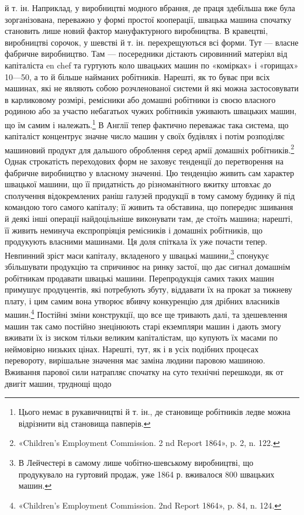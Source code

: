 й т. ін. Наприклад, у виробництві модного вбрання, де праця
здебільша вже була зорганізована, переважно у формі простої
кооперації, швацька машина спочатку становить лише новий
фактор мануфактурного виробництва. В кравецтві, виробництві
сорочок, у шевстві й т. ін. перехрещуються всі форми. Тут —
власне фабричне виробництво. Там — посередники дістають сировинний
матеріял від капіталіста en chef та гуртують коло швацьких
машин по «комірках» і «горищах» 10—50, а то й більше найманих
робітників. Нарешті, як то буває при всіх машинах, які не
являють собою розчленованої системи й які можна застосовувати
в карликовому розмірі, ремісники або домашні робітники із
своєю власного родиною або за участю небагатьох чужих робітників
уживають швацьких машин, що їм самим і належать.\footnote{
Цього немає в рукавичництві й т. ін., де становище робітників
ледве можна відрізнити від становища павперів.
}
В Англії тепер фактично переважає така система, що капіталіст
концентрує значне число машин у своїх будівлях і потім розподіляє
машиновий продукт для дальшого оброблення серед армії
домашніх робітників.\footnote{
«Children’s Employment Commission. 2 nd Report 1864», p. 2,
n. 122.
} Однак строкатість переходових форм
не заховує тенденції до перетворення на фабричне виробництво
у власному значенні. Цю тенденцію живить сам характер швацької
машини, що її придатність до різноманітного вжитку штовхає
до сполучення відокремлених раніш галузей продукції в
тому самому будинку й під командою того самого капіталу; її
живить та обставина, що попереднє зшивання й деякі інші операції
найдоцільніше виконувати там, де стоїть машина; нарешті,
її живить неминуча експропріяція ремісників і домашніх робітників,
що продукують власними машинами. Ця доля спіткала
їх уже почасти тепер. Невпинний зріст маси капіталу, вкладеного
у швацькі машини,\footnote{
В Лейчестері в самому лише чобітно-шевському виробництві,
що продукувало на гуртовий продаж, уже 1864 р. вживалося 800 швацьких
машин.
} спонукує збільшувати продукцію та спричинює
на ринку застої, що дає сигнал домашнім робітникам продавати
швацькі машини. Перепродукція самих таких машин примушує
продуцентів, які потребують збуту, віддавати їх на прокат
за тижневу плату, і цим самим вона утворює вбивчу конкуренцію
для дрібних власників машин.\footnote{
«Children’s Employment Commission. 2nd Report 1864», p. 84,
n. 124.
} Постійні зміни конструкції,
що все ще тривають далі, та здешевлення машин так само постійно
знецінюють старі екземпляри машин і дають змогу вживати їх
із зиском тільки великим капіталістам, що купують їх масами
по неймовірно низьких цінах. Нарешті, тут, як і в усіх подібних
процесах перевороту, вирішальне значення має заміна людини
паровою машиною. Вживання парової сили натрапляє спочатку
на суто технічні перешкоди, як от двигіт машин, труднощі щодо